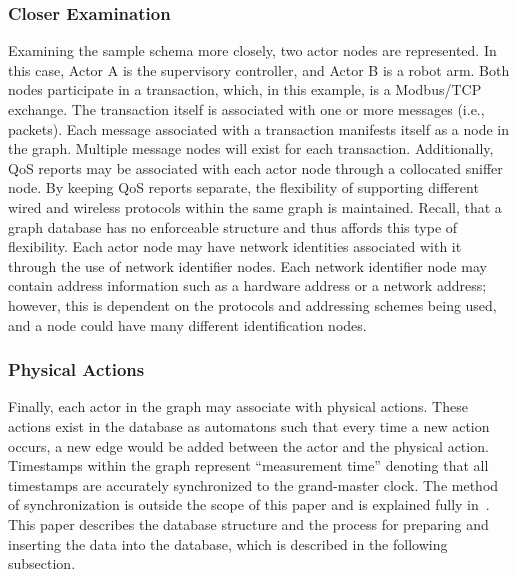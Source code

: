 \subsubsection{Closer Examination}
Examining the sample schema more closely, two actor nodes are represented.  In this case, Actor A is the supervisory controller, and Actor B is a robot arm.  Both nodes participate in a transaction, which, in this example, is a Modbus/TCP exchange. The transaction itself is associated with one or more messages (i.e., packets). Each message associated with a transaction manifests itself as a node in the graph. Multiple message nodes will exist for each transaction. 
Additionally, QoS reports may be associated with each actor node through a collocated sniffer node.  By keeping QoS reports separate, the flexibility of supporting different wired and wireless protocols within the same graph is maintained. Recall, that a graph database has no enforceable structure and thus affords this type of flexibility. Each actor node may have network identities associated with it through the use of network identifier nodes.  Each network identifier node may contain address information such as a hardware address or a network address; however, this is dependent on the protocols and addressing schemes being used, and a node could have many different identification nodes. 
\subsubsection{Physical Actions}
Finally, each actor in the graph may associate with physical actions.  These actions exist in the database as automatons such that every time a new action occurs, a new edge would be added between the actor and the physical action.  Timestamps within the graph represent ``measurement time'' denoting that all  timestamps are accurately synchronized to the grand-master clock.  The method of synchronization is outside the scope of this paper and is explained fully in~\cite{Liu2019vancouver}.  This paper describes the database structure and the process for preparing and inserting the data into the database, which is described in the following subsection.

